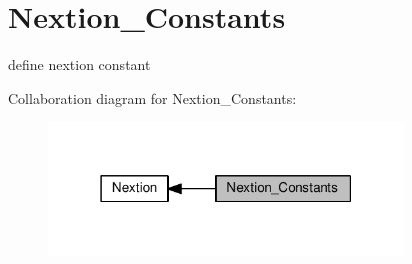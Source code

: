 \hypertarget{group__nextion___constants}{}\section{Nextion\+\_\+\+Constants}
\label{group__nextion___constants}


define nextion constant  


Collaboration diagram for Nextion\+\_\+\+Constants\+:\nopagebreak
\begin{figure}[H]
\begin{center}
\leavevmode
\includegraphics[width=267pt]{d8/d87/group__nextion___constants}
\end{center}
\end{figure}
